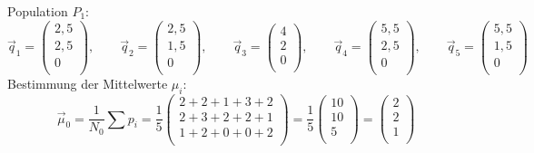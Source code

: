 Population $P_1$:
\[
\vec{q}_1 =
\left(
\begin {array} {c}

2,5 \\

2,5 \\

0 \\

\end {array}
\right)
, \qquad
\vec{q}_2 =
\left(
\begin {array} {c}

2,5 \\

1,5 \\

0 \\

\end {array}
\right)
, \qquad
\vec{q}_3 =
\left(
\begin {array} {c}

4 \\

2 \\

0 \\

\end {array}
\right)
, \qquad
\vec{q}_4 =
\left(
\begin {array} {c}

5,5 \\

2,5 \\

0 \\

\end {array}
\right)
, \qquad
\vec{q}_5 =
\left(
\begin {array} {c}

5,5 \\

1,5 \\

0 \\

\end {array}
\right)
\]
Bestimmung der Mittelwerte $\mu_i$:
\[
\vec{\mu}_0 = \frac{1}{N_0} \sum{p_i} = \frac{1}{5}
\left(
\begin {array} {c}
2 + 2 + 1 + 3 + 2 \\
2 + 3 + 2 + 2 + 1 \\
1 + 2 + 0 + 0 + 2 \\
\end{array}
\right)
= \frac{1}{5}
\left(
\begin {array} {c}
10 \\
10 \\
5 \\
\end {array}
\right)
=
\left(
\begin {array} {c}
2 \\
2 \\
1 \\
\end {array}
\right)
\]
